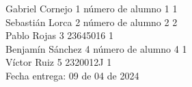 \documentclass[letterpaper]{article}
\begin{document}
	\vspace*{30mm}
	\flushright 
	
	Gabriel Cornejo  1	número de alumno 1 1\\
	Sebastián Lorca  2	número de alumno 2 2\\
	Pablo Rojas  3	23645016 1\\
	Benjamín Sánchez  4	número de alumno 4 1\\
	Víctor Ruiz  5	2320012J 1\\
	
	
	\vspace*{5mm}
	{\large Fecha entrega: 09 de 04 de 2024\\}
	
	\newpage
	\begin{flushleft}
		\tableofcontents
	\end{flushleft}
	
\end{document}
